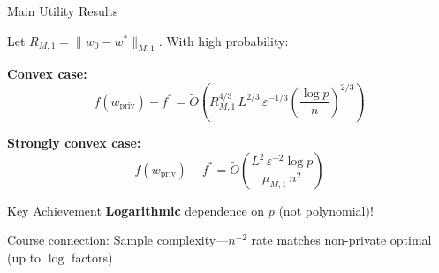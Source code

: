 \documentclass{beamer}
\begin{document}
\begin{frame}{Main Utility Results}
\begin{theorem}
Let $R_{M,1} = \|w_0 - w^*\|_{M,1}$. With high probability:

\vspace{0.5em}

\textbf{Convex case:}
\[
f(w_{\text{priv}}) - f^* = \widetilde{O}\!\left( R_{M,1}^{4/3} \, L^{2/3} \, \varepsilon^{-1/3} \left(\frac{\log p}{n}\right)^{2/3} \right)
\]

\textbf{Strongly convex case:}
\[
f(w_{\text{priv}}) - f^* = \widetilde{O}\!\left( \frac{L^2 \, \varepsilon^{-2} \log p}{\mu_{M,1} \, n^2} \right)
\]
\end{theorem}

\vspace{1em}

\begin{alertblock}{Key Achievement}
\textbf{Logarithmic} dependence on $p$ (not polynomial)!
\end{alertblock}

\vspace{0.3em}

\alert{Course connection:} Sample complexity—$n^{-2}$ rate matches non-private optimal (up to $\log$ factors)
\end{frame}
\end{document}

